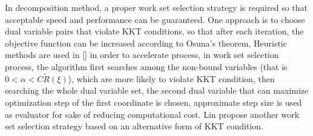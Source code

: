 \documentclass[12pt, draftclsnofoot, onecolumn]{IEEEtran}
\begin{document}
In decomposition method, a proper work set selection strategy is required so that acceptable speed and performance can be guaranteed. One approach is to choose dual variable pairs that violate KKT conditions, so that after each iteration, the objective function can be increased according to Osuna's theorem\cite{inproved training algorithms for support vector machines}, Heuristic methods are used in [\cite{SMO}] in order to accelerate process, in work set selection process, the algorithm first searches among the non-bound variables (that is $0<\alpha<C\tilde{R}(\xi)$), which are more likely to violate KKT condition, then searching the whole dual variable set, the second dual variable that can maximize optimization step of the first coordinate is chosen, approximate step size is used as evaluator for sake of reducing computational cost. Lin propose another work set selection strategy based on an alternative form of KKT condition.
\end{document}
